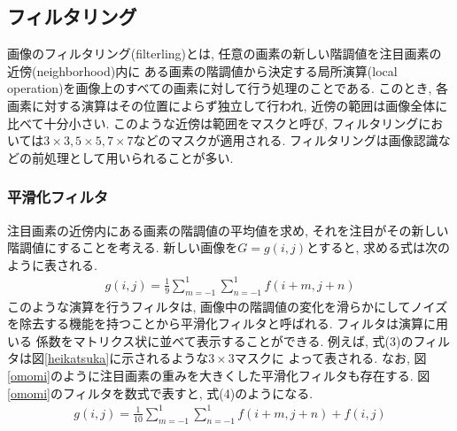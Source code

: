 \documentclass[a4paper,11pt,uplatex, titlepage]{jsarticle}
\begin{document}
\subsection{フィルタリング}
画像のフィルタリング(filterling)とは, 任意の画素の新しい階調値を注目画素の近傍(neighborhood)内に
ある画素の階調値から決定する局所演算(local operation)を画像上のすべての画素に対して行う処理のことである.
このとき, 各画素に対する演算はその位置によらず独立して行われ, 近傍の範囲は画像全体に比べて十分小さい. このような近傍は範囲をマスクと呼び,
フィルタリングにおいては$3\times3, 5\times5, 7\times7$などのマスクが適用される. フィルタリングは画像認識などの前処理として用いられることが多い.
\subsubsection{平滑化フィルタ}
注目画素の近傍内にある画素の階調値の平均値を求め, それを注目がその新しい階調値にすることを考える. 新しい画像を$G = g(i,j)$とすると, 求める式は次のように表される.
\begin{align}
  g(i,j) = \frac{1}{9} \sum_{m=-1}^{1} \sum_{n=-1}^{1} f(i+m, j+n)
\end{align}
このような演算を行うフィルタは, 画像中の階調値の変化を滑らかにしてノイズを除去する機能を持つことから平滑化フィルタと呼ばれる. フィルタは演算に用いる
係数をマトリクス状に並べて表示することができる. 例えば, 式(3)のフィルタは図\ref{heikatsuka}に示されるような$3\times3$マスクに
よって表される. なお, 図\ref{omomi}のように注目画素の重みを大きくした平滑化フィルタも存在する. 図\ref{omomi}のフィルタを数式で表すと,
式(4)のようになる.
\begin{align}
  g(i,j) = \frac{1}{10} { \sum_{m=-1}^{1} \sum_{n=-1}^{1} f(i+m, j+n)+f(i,j) }
\end{align}
\end{document}
